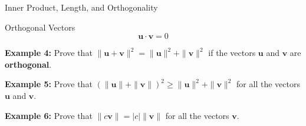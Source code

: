 \documentclass[10pt, aspectratio=169]{beamer}
\begin{document}
\begin{frame}{Inner Product, Length, and Orthogonality}
{\begin{center}
{{\begin{definition}{Orthogonal Vectors}
\[
\mathbf{u} \cdot \mathbf{v} = 0
\]
\end{definition}
}}
\end{center}

\textbf{Example 4:} Prove that 
\(\|\mathbf{u} + \mathbf{v} \|^2 = \| \mathbf{u}\|^2 + \| \mathbf{v}\|^2\) if the vectors \(\mathbf{u}\) and \(\mathbf{v}\) are \textbf{orthogonal}.

\vspace{0.25cm}

\textbf{Example 5:} Prove that 
\((\|\mathbf{u}\| + \|\mathbf{v} \|)^2 \geq \| \mathbf{u}\|^2 + \| \mathbf{v}\|^2\) for all the vectors \(\mathbf{u}\) and \(\mathbf{v}\).

\vspace{0.25cm}

\textbf{Example 6:} Prove that 
\(\|c\mathbf{v}\| = |c|\|\mathbf{v}\|\) for all the vectors \(\mathbf{v}\).
}
\end{frame}
\end{document}
